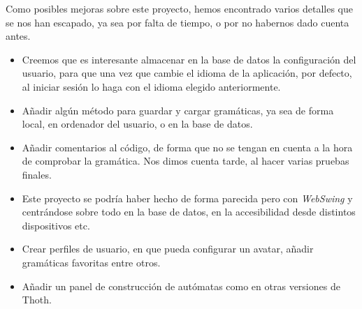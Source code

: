 Como posibles mejoras sobre este proyecto, hemos encontrado varios detalles que se nos han escapado, ya sea por falta de tiempo, o por no habernos dado cuenta antes.
\begin{itemize}
\item Creemos que es interesante almacenar en la base de datos la configuración del usuario, para que una vez que cambie el idioma de la aplicación, por defecto, al iniciar sesión lo haga con el idioma elegido anteriormente.

\item Añadir algún método para guardar y cargar gramáticas, ya sea de forma local, en ordenador del usuario, o en la base de datos.

\item Añadir comentarios al código, de forma que no se tengan en cuenta a la hora de comprobar la gramática. Nos dimos cuenta tarde, al hacer varias pruebas finales.
\item Este proyecto se podría haber hecho de forma parecida pero con \emph{WebSwing} y centrándose sobre todo en la base de datos, en la accesibilidad desde distintos dispositivos etc.

\item Crear perfiles de usuario, en que pueda configurar un avatar, añadir gramáticas favoritas entre otros.

\item Añadir un panel de construcción de autómatas como en otras versiones de Thoth.
\end{itemize}